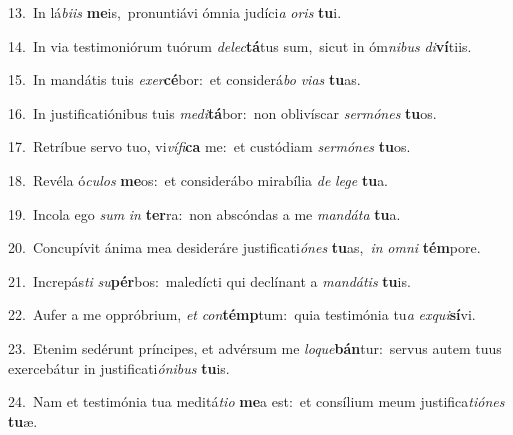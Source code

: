 {\numbfont\textcolor{\numbcolor}{13.}}~In lá\-\textit{bi}\-\textit{is} \textbf{me}\-is,~\star pronuntiávi ómnia judíci\textit{a} \textit{o}\-\textit{ris} \textbf{tu}\-i.\par
{\numbfont\textcolor{\numbcolor}{14.}}~In via testimoniórum tuórum \textit{de}\-\textit{lec}\textbf{tá}tus sum,~\star sicut in óm\-\textit{ni}\-\textit{bus} \textit{di}\-\textbf{ví}tiis.\par
{\numbfont\textcolor{\numbcolor}{15.}}~In mandátis tuis \textit{ex}\-\textit{er}\textbf{cé}bor:~\star et considerá\textit{bo} \textit{vi}\-\textit{as} \textbf{tu}\-as.\par
{\numbfont\textcolor{\numbcolor}{16.}}~In justificatiónibus tuis \textit{me}\-\textit{di}\textbf{tá}bor:~\star non oblivíscar \textit{ser}\-\textit{mó}\textit{nes} \textbf{tu}\-os.\par
{\numbfont\textcolor{\numbcolor}{17.}}~Retríbue servo tuo, vi\-\textit{ví}\-\textit{fi}\textbf{ca} me:~\star et custódiam \textit{ser}\-\textit{mó}\textit{nes} \textbf{tu}\-os.\par
{\numbfont\textcolor{\numbcolor}{18.}}~Revéla ó\-\textit{cu}\-\textit{los} \textbf{me}\-os:~\star et considerábo mirabília \textit{de} \textit{le}\-\textit{ge} \textbf{tu}\-a.\par
{\numbfont\textcolor{\numbcolor}{19.}}~Incola ego \textit{sum} \textit{in} \textbf{ter}\-ra:~\star non abscóndas a me \textit{man}\-\textit{dá}\textit{ta} \textbf{tu}\-a.\par
{\numbfont\textcolor{\numbcolor}{20.}}~Concupívit ánima mea desideráre justificati\-\textit{ó}\-\textit{nes} \textbf{tu}\-as,~\star \textit{in} \textit{om}\-\textit{ni} \textbf{tém}\-pore.\par
{\numbfont\textcolor{\numbcolor}{21.}}~Increpás\textit{ti} \textit{su}\-\textbf{pér}bos:~\star maledícti qui declínant a \textit{man}\-\textit{dá}\textit{tis} \textbf{tu}\-is.\par
{\numbfont\textcolor{\numbcolor}{22.}}~Aufer a me oppróbrium, \textit{et} \textit{con}\-\textbf{témp}tum:~\star quia testimónia tu\textit{a} \textit{ex}\-\textit{qui}\textbf{sí}vi.\par
{\numbfont\textcolor{\numbcolor}{23.}}~Etenim sedérunt príncipes, et advérsum me \textit{lo}\-\textit{que}\textbf{bán}tur:~\star servus autem tuus exercebátur in justificati\-\textit{ó}\-\textit{ni}\textit{bus} \textbf{tu}\-is.\par
{\numbfont\textcolor{\numbcolor}{24.}}~Nam et testimónia tua meditá\-\textit{ti}\-\textit{o} \textbf{me}\-a est:~\star et consílium meum justifica\-\textit{ti}\-\textit{ó}\textit{nes} \textbf{tu}\-æ.\par
